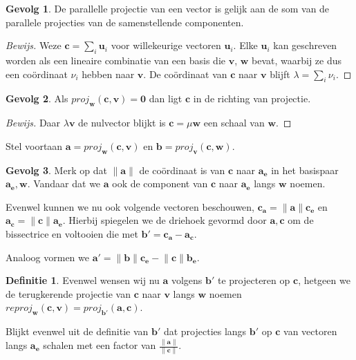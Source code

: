 \documentclass{amsart}
\theoremstyle{definition}
\newtheorem{dfn}{Definitie}[section]
\newtheorem{csq}{Gevolg}[section]
\newenvironment{bewijs}{\begin{proof}[Bewijs]}{\end{proof}}
\newcommand{\norm}[1]{\lVert{#1}\rVert}
\newcommand{\vvec}[1][v]{\mathbf{#1}}
\newcommand{\uvec}[1][v]{\vvec[#1]_\mathbf{e}}
\newcommand{\vnorm}[1]{\norm{\vvec[#1]}}
\newcommand{\zerovec}{\vvec[0]}
\begin{document}
\begin{csq}
    De parallelle projectie van een vector is gelijk aan de som van de parallele projecties van de samenstellende componenten.
    \begin{bewijs}
        Weze $\vvec[c] = \sum_{i} {\vvec[u]}_i$ voor willekeurige vectoren $\vvec[u]_i$.
        Elke ${\vvec[u]}_i$ kan geschreven worden als een lineaire combinatie van een basis die $\vvec$, $\vvec[w]$ bevat, waarbij ze dus een coördinaat $\nu_i$ hebben naar $\vvec$.
        De coördinaat van $\vvec[c]$ naar $\vvec$ blijft $\lambda = \sum_i \nu_i$.
    \end{bewijs}
\end{csq}

\begin{csq}
    Als $proj_{\vvec[w]}(\vvec[c], \vvec) = \zerovec$ dan ligt $\vvec[c]$ in de richting van projectie.
    \begin{bewijs}
        Daar $\lambda\vvec$ de nulvector blijkt is $\vvec[c] = \mu\vvec[w]$ een schaal van $\vvec[w]$.
    \end{bewijs}
\end{csq}

Stel voortaan $\vvec[a] = proj_{\vvec[w]}(\vvec[c], \vvec)$ en $\vvec[b] = proj_{\vvec}(\vvec[c], \vvec[w])$.

\begin{csq}
    Merk op dat $\vnorm{a}$ de coördinaat is van $\vvec[c]$ naar $\uvec[a]$ in het basispaar $\uvec[a], \vvec[w]$.
    Vandaar dat we $\vvec[a]$ ook de component van $\vvec[c]$ naar $\uvec[a]$ langs $\vvec[w]$ noemen.
\end{csq}

Evenwel kunnen we nu ook volgende vectoren beschouwen, $\vvec[c_a] = \vnorm a \uvec[c]$ en $\vvec[a_c] = \vnorm c \uvec[a]$.
Hierbij spiegelen we de driehoek gevormd door $\vvec[a], \vvec[c]$ om de bissectrice en voltooien die met $\vvec[b'] = \vvec[c_a] - \vvec[a_c]$.

Analoog vormen we $\vvec[a'] = \vnorm b\uvec[c] - \vnorm c\uvec[b]$.

\begin{dfn}
    Evenwel wensen wij nu $\vvec[a]$ volgens $\vvec[b']$ te projecteren op $\vvec[c]$, hetgeen we de terugkerende projectie van $\vvec[c]$ naar $\vvec$ langs $\vvec[w]$ noemen $reproj_{\vvec[w]}(\vvec[c], \vvec) = proj_{\vvec[b']}(\vvec[a], \vvec[c])$.
\end{dfn}

Blijkt evenwel uit de definitie van $\vvec[b']$ dat projecties langs $\vvec[b']$ op $\vvec[c]$ van vectoren langs $\uvec[a]$ schalen met een factor van $\frac{\vnorm a}{\vnorm c}$.
\end{document}
